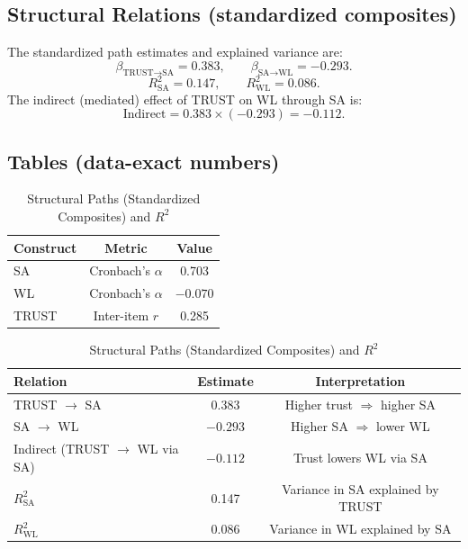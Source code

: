 \documentclass[conference]{IEEEtran}
\begin{document}
\begin{table}[t]
\subsection{Structural Relations (standardized composites)}
The standardized path estimates and explained variance are:
\[
\beta_{\text{TRUST}\rightarrow\text{SA}} = \mathbf{0.383}, \qquad
\beta_{\text{SA}\rightarrow\text{WL}} = \mathbf{-0.293}.
\]
\[
R^2_{\text{SA}} = \mathbf{0.147}, \qquad
R^2_{\text{WL}} = \mathbf{0.086}.
\]
The indirect (mediated) effect of TRUST on WL through SA is:
\[
\text{Indirect} = 0.383 \times (-0.293) = \mathbf{-0.112}.
\]

\subsection{Tables (data-exact numbers)}
\begin{table}[h]
\centering
\caption{Internal Consistency from \textit{Raw\_Data}}
\begin{tabular}{lcc}
\toprule
Construct & Metric & Value \\
\midrule
SA    & Cronbach's $\alpha$ & 0.703 \\
WL    & Cronbach's $\alpha$ & $-0.070$ \\
TRUST & Inter-item $r$      & 0.285 \\
\bottomrule
\end{tabular}
\end{table}

\begin{table}[h]
\centering
\caption{Structural Paths (Standardized Composites) and $R^2$}
\begin{tabular}{lcc}
\toprule
Relation & Estimate & Interpretation \\
\midrule
TRUST $\rightarrow$ SA & 0.383 & Higher trust $\Rightarrow$ higher SA \\

SA $\rightarrow$ WL    & $-0.293$ & Higher SA $\Rightarrow$ lower WL \\

Indirect (TRUST $\rightarrow$ WL via SA) & $-0.112$ & Trust lowers WL via SA \\

$R^2_{\text{SA}}$ & 0.147 & Variance in SA explained by TRUST \\
$R^2_{\text{WL}}$ & 0.086 & Variance in WL explained by SA \\
\bottomrule
\end{tabular}
\end{table}


\end{table}
\end{document}
